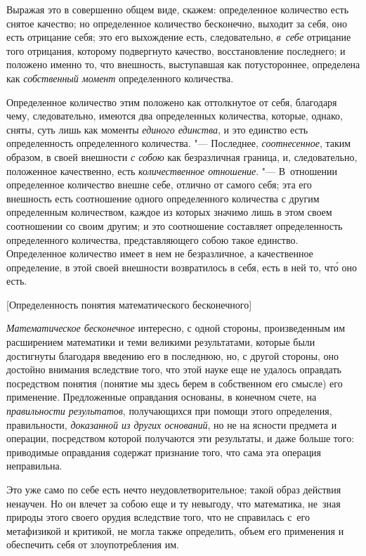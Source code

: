 Выражая это в совершенно общем виде, скажем: определенное количество есть
снятое качество; но определенное количество бесконечно, выходит за себя, оно
есть отрицание себя; это его выхождение есть, следовательно, {\em в~себе}
отрицание того отрицания, которому подвергнуто качество, восстановление
последнего; и положено именно то, что внешность, выступавшая как потустороннее,
определена как {\em собственный момент} определенного количества.

Определенное количество этим положено как оттолкнутое от себя, благодаря чему,
следовательно, имеются два определенных количества, которые, однако, сняты,
суть лишь как моменты {\em единого единства}, и это единство есть
определенность определенного количества. "--- Последнее, {\em соотнесенное},
таким образом, в своей внешности {\em с собою} как безразличная граница, и,
следовательно, положенное качественно, есть {\em количественное отношение}.
"--- В~отношении определенное количество внешне себе, отлично от самого себя;
эта его внешность есть соотношение одного определенного количества с другим
определенным количеством, каждое из которых значимо лишь в этом своем
соотношении со своим другим; и это соотношение составляет определенность
определенного количества, представляющего собою такое единство. Определенное
количество имеет в нем не безразличное, а качественное определение, в этой
своей внешности возвратилось в себя, есть в ней то, чт\'{о} оно есть.

%
{[Определенность понятия математического бесконечного]}

{\em Математическое бесконечное} интересно, с одной стороны, произведенным им
расширением математики и теми великими результатами, которые были достигнуты
благодаря введению его в последнюю, но, с другой стороны, оно достойно внимания
вследствие того, что этой науке еще не удалось оправдать посредством понятия
(понятие мы здесь берем в собственном его смысле) его применение. Предложенные
оправдания основаны, в конечном счете, на {\em правильности результатов},
получающихся при помощи этого определения, правильности,
{\em доказанной из других оснований}, но не на ясности предмета и операции,
посредством которой получаются эти результаты, и даже больше того: приводимые
оправдания содержат признание того, что сама эта операция неправильна.

Это уже само по себе есть нечто неудовлетворительное; такой образ действия
ненаучен. Но он влечет за собою еще и ту невыгоду, что математика, не~зная
природы этого своего орудия вследствие того, что не справилась с~его
метафизикой и критикой, не могла также определить, объем его применения
и обеспечить себя от злоупотребления им.

